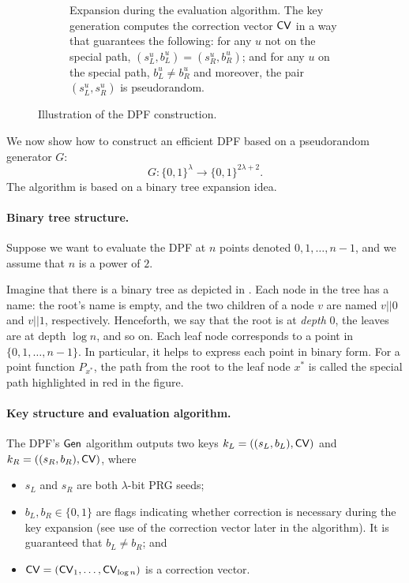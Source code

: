 \begin{figure}[t]
\begin{subfigure}{0.48\textwidth}
        \caption{Expansion during the evaluation algorithm.
The key generation computes the correction vector ${\sf CV}$ 
in a way that guarantees the following: 
for any $u$ not on the special
path, $(s_L^u, b_L^u) = (s_R^u, b_R^u)$;
and for any $u$ on the special path, 
$b_L^u \neq b_R^u$ and moreover,
the pair $(s_L^u, s_R^u)$ is pseudorandom.
}
\label{fig:expand}
    \end{subfigure}
     \caption{Illustration of the DPF construction.\label{fig:dpf-demo}}
\end{figure}





We now show how to construct an efficient DPF based on a pseudorandom
generator $G$:
 $$G: \{0,1\}^{\lambda} \rightarrow  \{0,1\}^{2\lambda + 2}. $$
The algorithm is based on a binary tree expansion idea.

\paragraph{Binary tree structure.}
Suppose we want to evaluate the DPF
at $n$ points denoted $0, 1, \ldots,  n-1$,
and we assume that $n$ is a power of $2$.

Imagine that there is a binary tree
as depicted in .
Each node in the tree has a name:  
the root's name is empty, and the two children of a node $v$ 
are named $v||0$ and $v||1$, respectively.
Henceforth, we say that the root is at {\it depth} $0$, the leaves
are at depth $\log n$, and so on.
Each leaf node corresponds to a point in 
$\{0, 1, \ldots, n-1\}$. In particular, it helps to express
each point in binary form.
For a point function $P_{x^*}$, 
the path from the root to the leaf node $x^*$ 
is called the special path highlighted in {\color{red}red}
in the figure. 

\paragraph{Key structure and evaluation algorithm.}
The DPF's ${\sf Gen}$ algorithm outputs two keys
$k_L = ((s_L, b_L), {{\sf CV}})$ and $k_R = ((s_R, b_R), {{\sf CV}})$,
where 
\begin{itemize}[leftmargin=7mm]
\item $s_L$ and $s_R$ are both $\lambda$-bit PRG seeds;
\item 
$b_L, b_R\in \{0, 1\}$ are flags indicating whether 
correction is necessary during the key expansion (see use
of the correction vector later in the algorithm). It
is guaranteed that $b_L \neq b_R$; 
and 
\item 
${\sf CV} = ({\sf CV}_1, \ldots, {\sf CV}_{\log n})$ 
is a correction vector.
\end{itemize}

